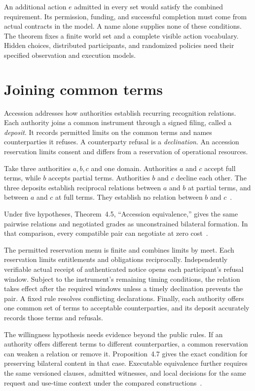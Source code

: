 \documentclass{momentum}
\begin{document}
An additional action $e$ admitted in every set would satisfy the combined requirement.
Its permission, funding, and successful completion must come from actual contracts in the model.
A name alone supplies none of these conditions.
The theorem fixes a finite world set and a complete visible action vocabulary.
Hidden choices, distributed participants, and randomized policies need their specified observation and execution models.

\section{Joining common terms}
\label{sec:accession}

Accession addresses how authorities establish recurring recognition relations.
Each authority joins a common instrument through a signed filing, called a \emph{deposit}.
It records permitted limits on the common terms and names counterparties it refuses.
A counterparty refusal is a \emph{declination}.
An accession reservation limits consent and differs from a reservation of operational resources.

Take three authorities $a,b,c$ and one domain.
Authorities $a$ and $c$ accept full terms, while $b$ accepts partial terms.
Authorities $b$ and $c$ decline each other.
The three deposits establish reciprocal relations between $a$ and $b$ at partial terms, and between $a$ and $c$ at full terms.
They establish no relation between $b$ and $c$~\cite[Section~2.2]{accession}.

Under five hypotheses, Theorem~4.5, ``Accession equivalence,'' gives the same pairwise relations and negotiated grades as unconstrained bilateral formation. In that comparison, every compatible pair can negotiate at zero cost~\cite[Section~4]{accession}.

The permitted reservation menu is finite and combines limits by meet.
Each reservation limits entitlements and obligations reciprocally.
Independently verifiable actual receipt of authenticated notice opens each participant's refusal window.
Subject to the instrument's remaining timing conditions, the relation takes effect after the required windows unless a timely declination prevents the pair.
A fixed rule resolves conflicting declarations.
Finally, each authority offers one common set of terms to acceptable counterparties, and its deposit accurately records those terms and refusals.

The willingness hypothesis needs evidence beyond the public rules.
If an authority offers different terms to different counterparties, a common reservation can weaken a relation or remove it.
Proposition~4.7 gives the exact condition for preserving bilateral content in that case.
Executable equivalence further requires the same versioned clauses, admitted witnesses, and local decisions for the same request and use-time context under the compared constructions~\cite[Section~6.3, Proposition~6.1]{accession}.
\end{document}
